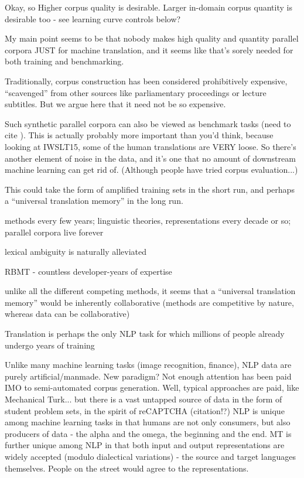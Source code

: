Okay, so Higher corpus quality is desirable.
Larger in-domain corpus quantity is desirable too - see learning curve controls below?



My main point seems to be that nobody makes high quality and quantity parallel corpora JUST for machine translation, and it seems like that's sorely needed for both training and benchmarking.

Traditionally, corpus construction has been considered prohibitively expensive, ``scavenged'' from other sources like parliamentary proceedings or lecture subtitles.
But we argue here that it need not be so expensive.

Such synthetic parallel corpora can also be viewed as benchmark tasks (need to cite ).
This is actually probably more important than you'd think, because looking at IWSLT15, some of the human translations are VERY loose.
So there's another element of noise in the data, and it's one that no amount of downstream machine learning can get rid of.
(Although people have tried corpus evaluation...)





This could take the form of amplified training sets in the short run, and perhaps a ``universal translation memory'' in the long run.

methods every few years; linguistic theories, representations every decade or so; parallel corpora live forever

lexical ambiguity is naturally alleviated

RBMT - countless developer-years of expertise

unlike all the different competing methods, it seems that a ``universal translation memory'' would be inherently collaborative (methods are competitive by nature, whereas data can be collaborative)





Translation is perhaps the only NLP task for which millions of people already undergo years of training


Unlike many machine learning tasks (image recognition, finance), NLP data are purely artificial/manmade.  New paradigm?  Not enough attention has been paid IMO to semi-automated corpus generation.  Well, typical approaches are paid, like Mechanical Turk... but there is a vast untapped source of data in the form of student problem sets, in the spirit of reCAPTCHA (citation!?)
NLP is unique among machine learning tasks in that humans are not only consumers, but also producers of data - the alpha and the omega, the beginning and the end.
MT is further unique among NLP in that both input and output representations are widely accepted (modulo dialectical variations) - the source and target languages themselves.
People on the street would agree to the representations.



